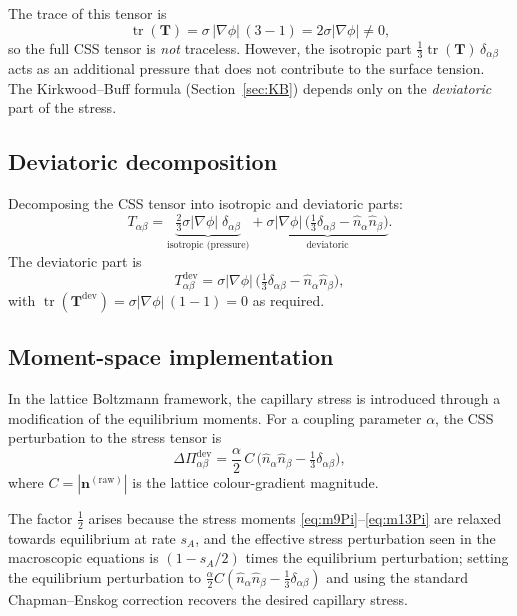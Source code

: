 \documentclass[11pt,a4paper]{article}
\newcommand{\vect}[1]{\bm{#1}}
\newcommand{\tens}[1]{\bm{#1}}
\newcommand{\tr}{\operatorname{tr}}
\begin{document}
The trace of this tensor is
\begin{equation}
  \tr(\tens{T}) = \sigma\,|\nabla\phi|\,(3-1) = 2\sigma|\nabla\phi|
  \neq 0,
\end{equation}
so the full CSS tensor is \emph{not} traceless.  However, the isotropic
part $\frac{1}{3}\tr(\tens{T})\,\delta_{\alpha\beta}$ acts as an
additional pressure that does not contribute to the surface tension.
The Kirkwood--Buff formula (Section~\ref{sec:KB}) depends only on the
\emph{deviatoric} part of the stress.

\subsection{Deviatoric decomposition}

Decomposing the CSS tensor into isotropic and deviatoric parts:
\begin{equation}
  T_{\alpha\beta} = \underbrace{\tfrac{2}{3}\sigma|\nabla\phi|
  \;\delta_{\alpha\beta}}_{\text{isotropic (pressure)}}
  + \underbrace{\sigma|\nabla\phi|\,
  \bigl(\tfrac{1}{3}\delta_{\alpha\beta} -
  \hat{n}_\alpha\hat{n}_\beta\bigr)}_{\text{deviatoric}}.
  \label{eq:decomp}
\end{equation}
The deviatoric part is
\begin{equation}
  T_{\alpha\beta}^{\text{dev}} = \sigma|\nabla\phi|\,
  \bigl(\tfrac{1}{3}\delta_{\alpha\beta} -
  \hat{n}_\alpha\hat{n}_\beta\bigr),
  \label{eq:Tdev}
\end{equation}
with $\tr(\tens{T}^{\text{dev}}) = \sigma|\nabla\phi|\,(1-1) = 0$ as
required.

\subsection{Moment-space implementation}

In the lattice Boltzmann framework, the capillary stress is introduced
through a modification of the equilibrium moments.  For a coupling
parameter $\alpha$, the CSS perturbation to the stress tensor is
\begin{equation}
  \Delta\Pi_{\alpha\beta}^{\text{dev}} = \frac{\alpha}{2}\, C\,
  \bigl(\hat{n}_\alpha\hat{n}_\beta - \tfrac{1}{3}\delta_{\alpha\beta}\bigr),
  \label{eq:DPi}
\end{equation}
where $C=|\vect{n}^{(\text{raw})}|$ is the lattice colour-gradient magnitude.

The factor $\frac{1}{2}$ arises because the stress moments
\eqref{eq:m9Pi}--\eqref{eq:m13Pi} are relaxed towards equilibrium at
rate $s_A$, and the effective stress perturbation seen in the
macroscopic equations is $(1-s_A/2)$ times the equilibrium
perturbation; setting the equilibrium perturbation to
$\frac{\alpha}{2}C(\hat{n}_\alpha\hat{n}_\beta -
\frac{1}{3}\delta_{\alpha\beta})$ and using the standard
Chapman--Enskog correction recovers the desired capillary stress.
\end{document}

